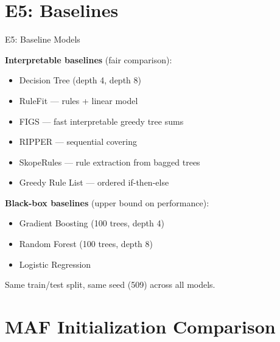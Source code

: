 \documentclass[aspectratio=169,12pt]{beamer}
\begin{document}
\section{E5: Baselines}

\begin{frame}{E5: Baseline Models}

\textbf{Interpretable baselines} (fair comparison):
\begin{itemize}
    \item Decision Tree (depth 4, depth 8)
    \item RuleFit --- rules + linear model
    \item FIGS --- fast interpretable greedy tree sums
    \item RIPPER --- sequential covering
    \item SkopeRules --- rule extraction from bagged trees
    \item Greedy Rule List --- ordered if-then-else
\end{itemize}

\vspace{1em}
\textbf{Black-box baselines} (upper bound on performance):
\begin{itemize}
    \item Gradient Boosting (100 trees, depth 4)
    \item Random Forest (100 trees, depth 8)
    \item Logistic Regression
\end{itemize}

\vspace{0.5em}
Same train/test split, same seed (509) across all models.

\end{frame}


\section{MAF Initialization Comparison}
\end{document}
